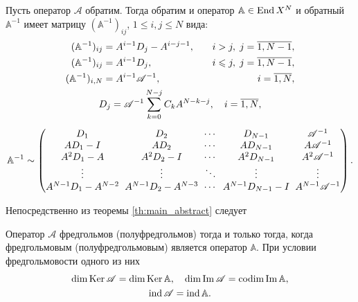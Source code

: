 \begin{theorem}\label{th:inverse}
    Пусть оператор $\mathcal A$ обратим. Тогда обратим и оператор $\mathbb A \in \operatorname{End} X^N$ и обратный $\mathbb A^{-1}$ имеет матрицу $(\mathbb A^{-1})_{ij}$, $1 \leq i, j \leq N$ вида:
    \begin{gather*}
        \begin{aligned}
        (\mathbb A^{-1})_{ij} &= A^{i-1} D_j - A^{i-j-1}, &\quad i > j, \; j = \overline{1,N-1}, \\
        (\mathbb A^{-1})_{ij} &= A^{i-1} D_j, &\quad i \leq j, \; j = \overline{1,N-1}, \\
        (\mathbb A^{-1})_{i,N} &= A^{i-1} \mathcal A^{-1}, &\quad i = \overline{1,N},
        \end{aligned}\\
        D_j = \mathcal A^{-1} \sum_{k = 0}^{N-j} C_k A^{N-k-j}, \quad i = \overline{1,N},\\[0.5em]
        \mathbb A^{-1} \sim
        \begingroup
        \renewcommand*{\arraycolsep}{3pt}
        \begin{pmatrix}
          D_1 &  D_2 &  \cdots & D_{N-1} &  \mathcal A^{-1} \\
          A D_1 - I & A D_2 & \cdots & A D_{N-1} & A  \mathcal A^{-1} \\
          A^2 D_1 - A & A^2 D_2 - I & \cdots & A^2 D_{N-1} & A^2 \mathcal A^{-1} \\
          \vdots & \vdots & \ddots & \vdots & \vdots \\
          A^{N-1} D_1 - A^{N-2} & A^{N-1} D_2 - A^{N-3} & \cdots & A^{N-1} D_{N-1} - I & A^{N-1}  \mathcal A^{-1}
       \end{pmatrix}
       \endgroup.
    \end{gather*}
\end{theorem}

Непосредственно из теоремы \ref{th:main_abstract} следует
\begin{theorem}\label{th:abstract_fredholm}
    Оператор $\mathcal A$ фредгольмов (полуфредгольмов) тогда и только тогда, когда фредгольмовым (полуфредгольмовым) является оператор $\mathbb A$. При условии фредгольмовости одного из них
    \begin{gather*}
    \dim \operatorname{Ker} \mathcal A = \dim \operatorname{Ker} \mathbb A, \quad \dim \operatorname{Im} \mathcal A = \operatorname{codim} \operatorname{Im} \mathbb A, \\
    \operatorname{ind} \mathcal A = \operatorname{ind} \mathbb A.
    \end{gather*}
\end{theorem}

